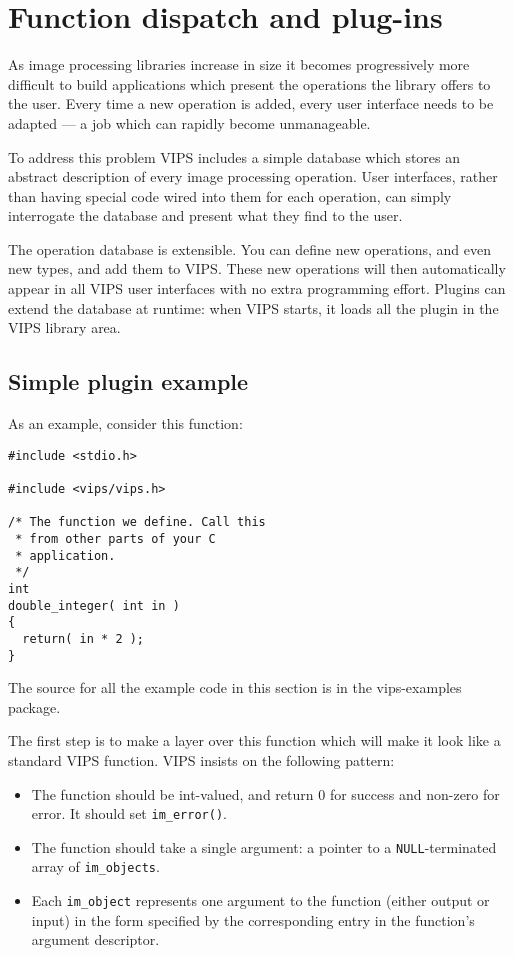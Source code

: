 \section{Function dispatch and plug-ins}

As image processing libraries increase in size it becomes progressively more
difficult to build applications which present the operations the library
offers to the user. Every time a new operation is added, every user interface
needs to be adapted --- a job which can rapidly become unmanageable.

To address this problem VIPS includes a simple database which stores an
abstract description of every image processing operation. User interfaces,
rather than having special code wired into them for each operation, can
simply interrogate the database and present what they find to the user.

The operation database is extensible. You can define new operations, and even
new types, and add them to VIPS. These new operations will then automatically
appear in all VIPS user interfaces with no extra programming effort. Plugins
can extend the database at runtime: when VIPS starts, it loads all the plugin
in the VIPS library area.

\subsection{Simple plugin example}

As an example, consider this function:

\begin{verbatim}
#include <stdio.h>

#include <vips/vips.h>

/* The function we define. Call this 
 * from other parts of your C 
 * application. 
 */
int
double_integer( int in )
{
  return( in * 2 );
}
\end{verbatim}

\noindent
The source for all the example code in this section is in the vips-examples
package. 

The first step is to make a layer over this function which will make it
look like a standard VIPS function. VIPS insists on the following pattern:

\begin{itemize}

\item
The function should be int-valued, and return 0 for success and non-zero
for error. It should set \verb+im_error()+.

\item
The function should take a single argument: a pointer to a
\verb+NULL+-terminated array of \verb+im_objects+.

\item
Each \verb+im_object+ represents one argument to the function (either output
or input) in the form specified by the corresponding entry in the function's
argument descriptor.

\end{itemize}

